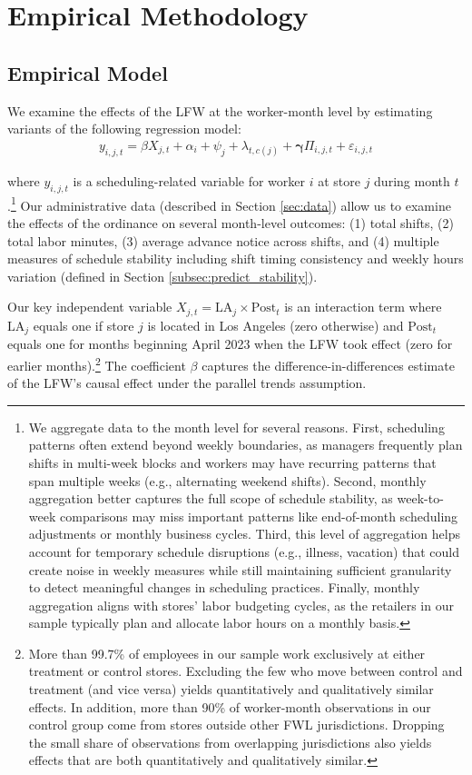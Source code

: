 \documentclass[letterpaper,11pt,leqno]{article}
\theoremstyle{paper}
\begin{document}
\section{Empirical Methodology} \label{sec:ident_strat}

\subsection{Empirical Model}
We examine the effects of the LFW at the worker-month level by estimating variants of the following regression model:
\begin{align}
y_{i,j,t} = \beta X_{j,t} +  \alpha_{i} + \psi_j +  \lambda_{t, c(j)} +  \bm{\gamma}\Pi_{i,j,t} + \varepsilon_{i,j,t} \label{eq:model}
\end{align}

where $y_{i,j,t}$ is a scheduling-related variable for worker $i$ at store $j$ during month $t$.\footnote{We aggregate data to the month level for several reasons. First, scheduling patterns often extend beyond weekly boundaries, as managers frequently plan shifts in multi-week blocks and workers may have recurring patterns that span multiple weeks (e.g., alternating weekend shifts). Second, monthly aggregation better captures the full scope of schedule stability, as week-to-week comparisons may miss important patterns like end-of-month scheduling adjustments or monthly business cycles. Third, this level of aggregation helps account for temporary schedule disruptions (e.g., illness, vacation) that could create noise in weekly measures while still maintaining sufficient granularity to detect meaningful changes in scheduling practices. Finally, monthly aggregation aligns with stores' labor budgeting cycles, as the retailers in our sample typically plan and allocate labor hours on a monthly basis.} Our administrative data (described in Section \ref{sec:data}) allow us to examine the effects of the ordinance on several month-level outcomes: (1) total shifts, (2) total labor minutes, (3) average advance notice across shifts, and (4) multiple measures of schedule stability including shift timing consistency and weekly hours variation (defined in Section \ref{subsec:predict_stability}).

Our key independent variable $X_{j,t} = \text{LA}_{j} \times \text{Post}_{t}$ is an interaction term where $\text{LA}_{j}$ equals one if store $j$ is located in Los Angeles (zero otherwise) and $\text{Post}_{t}$ equals one for months beginning April 2023 when the LFW took effect (zero for earlier months).\footnote{More than 99.7\% of employees in our sample work exclusively at either treatment or control stores. Excluding the few who move between control and treatment (and vice versa) yields quantitatively and qualitatively similar effects. In addition, more than 90\% of worker-month observations in our control group come from stores outside other FWL jurisdictions. Dropping the small share of observations from overlapping jurisdictions also yields effects that are both quantitatively and qualitatively similar.} The coefficient $\beta$ captures the difference-in-differences estimate of the LFW's causal effect under the parallel trends assumption.
\end{document}
